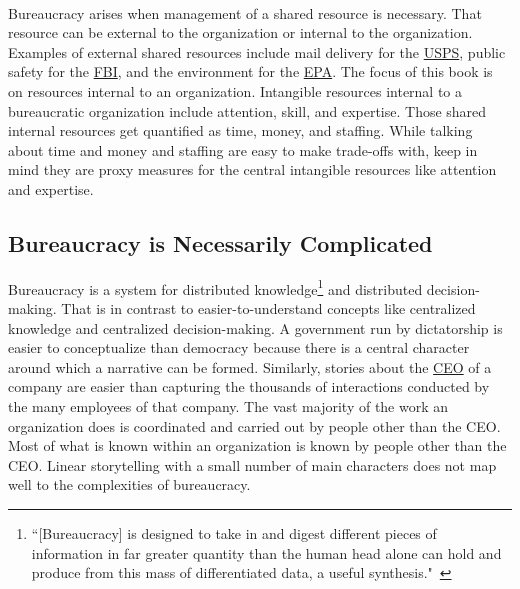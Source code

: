 \ \\

Bureaucracy arises when management of a shared resource is necessary.
That resource can be external to the organization or internal to the organization. Examples of external shared resources include mail delivery for the \href{https://en.wikipedia.org/wiki/United_States_Postal_Service}{USPS}, 
\iftoggle{WPinmargin}{\marginpar{$>$Wikipedia: USPS}}{}
public safety for the \href{https://en.wikipedia.org/wiki/Federal_Bureau_of_Investigation}{FBI}, 
and the environment for the \href{https://en.wikipedia.org/wiki/United_States_Environmental_Protection_Agency}{EPA}. 
The focus of this book is on resources internal to an organization. Intangible resources internal to a bureaucratic organization include attention, skill, and expertise. Those shared internal resources get quantified as time, money, and staffing. While talking about time and money and staffing are easy to make trade-offs with, keep in mind they are proxy measures for the central intangible resources like attention and expertise.

\subsection*{Bureaucracy is Necessarily Complicated}

Bureaucracy is a system for distributed knowledge\footnote{``[Bureaucracy] is designed to take in and digest different pieces of information in far greater quantity than the human head alone can hold and produce from this mass of differentiated data, a useful synthesis."~\cite{1966_Morison}} 
and distributed decision-making. 
That is in contrast to easier-to-understand concepts like centralized knowledge and centralized decision-making. A government run by dictatorship is easier to conceptualize than democracy because there is a central character around which a narrative can be formed. Similarly, stories about the \href{https://en.wikipedia.org/wiki/Chief_executive_officer}{CEO} 
\iftoggle{WPinmargin}{\marginpar{$>$Wikipedia: Chief executive officer}}{}
of a company are easier than capturing the thousands of interactions conducted by the many employees of that company. The vast majority of the work an organization does is coordinated and carried out by people other than the CEO. Most of what is known within an organization is known by people other than the CEO. Linear storytelling with a small number of main characters does not map well to the complexities of bureaucracy. 


